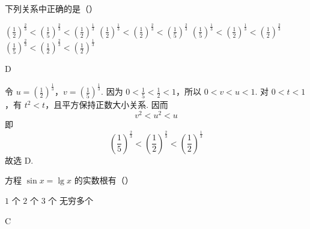 \begin{problem}
下列关系中正确的是（\quad）

\choices
    {\(\left( \frac{1}{2} \right)^{\frac{2}{3}}<\left( \frac{1}{5} \right)^{\frac{2}{3}}<\left( \frac{1}{2} \right)^{\frac{1}{3}}\)}
    {\(\left( \frac{1}{2} \right)^{\frac{1}{3}}<\left( \frac{1}{2} \right)^{\frac{2}{3}}<\left( \frac{1}{5} \right)^{\frac{2}{3}}\)}
    {\(\left( \frac{1}{5} \right)^{\frac{1}{3}}<\left( \frac{1}{2} \right)^{\frac{1}{3}}<\left( \frac{1}{2} \right)^{\frac{2}{3}}\)}
    {\(\left( \frac{1}{5} \right)^{\frac{2}{3}}<\left( \frac{1}{2} \right)^{\frac{2}{3}}<\left( \frac{1}{2} \right)^{\frac{1}{3}}\)}
\end{problem}

\begin{answer}
D
\end{answer}

\begin{solution}
令 \(u=\left(\frac12\right)^{\frac{1}{3}}\)，\(v=\left(\frac15\right)^{\frac{1}{3}}\). 因为 \(0<\frac15<\frac12<1\)，所以 \(0<v<u<1\). 对 \(0<t<1\)，有 \(t^2<t\)，且平方保持正数大小关系. 因而
\[
v^2<u^2<u
\]
即
\[
\left(\frac15\right)^{\frac{2}{3}}<\left(\frac12\right)^{\frac{2}{3}}<\left(\frac12\right)^{\frac{1}{3}}
\]
故选 D.
\end{solution}

\begin{problem}
方程 \(\sin x=\lg x\) 的实数根有（\quad）

\choices
    {\(1\) 个}
    {\(2\) 个}
    {\(3\) 个}
    {无穷多个}
\end{problem}

\begin{answer}
C
\end{answer}

